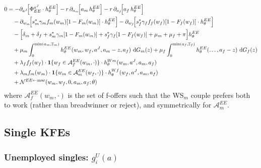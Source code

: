 \documentclass[11pt]{article}
\newcommand{\aJ}{a^{J}}
\newcommand{\bR}{\mathbf{1}}
\newcommand{\dG}{\,\mathrm{d}G}
\begin{document}
\begin{align}
    0 &= -\partial_{\aJ}\!\Bigl[\Phi^{\aJ}_{EE}\cdot h_\theta^{EE}\Bigr]
        - r\,\partial_{a_m}\!\Bigl[a_m\, h_\theta^{EE}\Bigr]
        - r\,\partial_{a_f}\!\Bigl[a_f\, h_\theta^{EE}\Bigr] \notag\\
    &\quad - \partial_{w_m}\!\Bigl[s_m^*\gamma_m f_m(w_m)[1-F_m(w_m)] \cdot h_\theta^{EE}\Bigr]
           - \partial_{w_f}\!\Bigl[s_f^*\gamma_f f_f(w_f)[1-F_f(w_f)] \cdot h_\theta^{EE}\Bigr] \notag\\
    &\quad - \Bigl[\delta_m + \delta_f
        + s_m^*\gamma_m[1-F_m(w_m)]
        + s_f^*\gamma_f[1-F_f(w_f)]
        + \mu_m + \mu_f + \pi\Bigr] h_\theta^{EE} \notag\\
    &\quad + \mu_m \int_0^{\min(a_m,\overline{z}_m)} h_\theta^{EE}(w_m, w_f, \aJ, a_m-z, a_f)\, \dG_m(z)
           + \mu_f \int_0^{\min(a_f,\overline{z}_f)} h_\theta^{EE}(\ldots, a_f-z)\, \dG_f(z) \notag\\
    &\quad + \lambda_f f_f(w_f) \cdot \bR\{w_f \in \mathcal{A}_f^{EE}(w_m, \cdot)\} \cdot h_\theta^{Wm}(w_m, \aJ, a_m, a_f) \notag\\
    &\quad + \lambda_m f_m(w_m) \cdot \bR\{w_m \in \mathcal{A}_m^{EE}(w_f, \cdot)\} \cdot h_\theta^{Wf}(w_f, \aJ, a_m, a_f) \notag\\
    &\quad + \mathcal{N}^{EE \leftarrow \text{mar}}(w_m, w_f, 0, a_m, a_f;\theta)
    \label{eq:KFE_EE}
\end{align}
where $\mathcal{A}_f^{EE}(w_m, \cdot)$ is the set of f-offers such that the WS$_m$ couple prefers both to work (rather than breadwinner or reject), and symmetrically for $\mathcal{A}_m^{EE}$.

\subsection{Single KFEs}

\subsubsection{Unemployed singles: $g_i^U(a)$}
\end{document}
